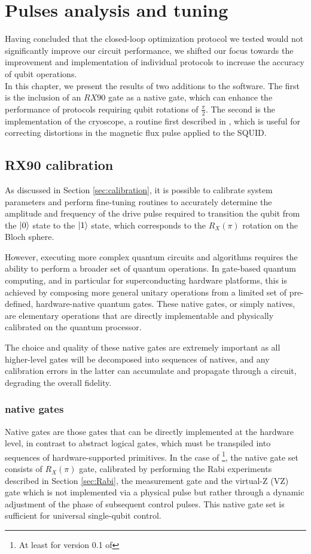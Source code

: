 \chapter{Pulses analysis and tuning}

Having concluded that the closed-loop optimization protocol we tested would not significantly improve our circuit performance, we shifted our focus towards the improvement and implementation of individual protocols to increase the accuracy of qubit operations.\\
In this chapter, we present the results of two additions to the \Qibocal software. 
The first is the inclusion of an $RX90$ gate as a native gate, which can enhance the performance of protocols requiring qubit rotations of $\frac{\pi}{2}$.
The second is the implementation of the cryoscope, a routine first described in \cite{rol_time-domain_2020}, which is useful for correcting distortions in the magnetic flux pulse applied to the SQUID.

\section{RX90 calibration}
As discussed in Section \ref{sec:calibration}, it is possible to calibrate system parameters and perform fine-tuning routines to accurately determine the amplitude and frequency of the drive pulse required to transition the qubit from the $\ket{0}$ state to the $\ket{1}$ state, which corresponds to the $R_X(\pi)$ rotation on the Bloch sphere.

However, executing more complex quantum circuits and algorithms requires the ability to perform a broader set of quantum operations. 
In gate-based quantum computing, and in particular for superconducting hardware platforms, this is achieved by composing more general unitary operations from a limited set of pre-defined, hardware-native quantum gates. 
These native gates, or simply natives, are elementary operations that are directly implementable and physically calibrated on the quantum processor.

The choice and quality of these native gates are extremely important as all higher-level gates will be decomposed into sequences of natives, and any calibration errors in the latter can accumulate and propagate through a circuit, degrading the overall fidelity. 

\subsection{\Qibolab native gates}\label{subsec:native_gates}
Native gates are those gates that can be directly implemented at the hardware level, in contrast to abstract logical gates, which must be transpiled into sequences of hardware-supported primitives. 
In the case of \Qibolab \footnote{At least for version 0.1 of \Qibolab}, the native gate set consists of $R_X(\pi)$ gate, calibrated by performing the Rabi experiments described in Section \ref{sec:Rabi}, the measurement gate and the virtual-Z (VZ) gate which is not implemented via a physical pulse but rather through a dynamic adjustment of the phase of subsequent control pulses. 
This native gate set is sufficient for universal single-qubit control.

